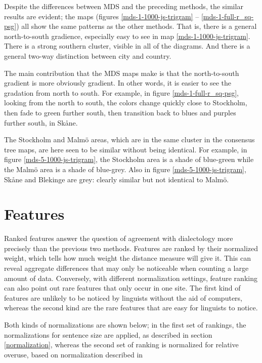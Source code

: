 Despite the differences between MDS and the preceding methods, the
similar results are evident; the maps (figures
\ref{mds-1-1000-js-trigram} -- \ref{mds-1-full-r_sq-psg}) all show
the same patterns as the other methods. That is, there is a general
north-to-south gradience, especially easy to see in map
\ref{mds-1-1000-js-trigram}. There is a strong southern cluster,
visible in all of the diagrams. And there is a general two-way
distinction between city and country.

The main contribution that the MDS maps make is that the
north-to-south gradient is more obviously gradient. In other words, it
is easier to see the gradation from north to south. For example, in
figure \ref{mds-1-full-r_sq-psg}, looking from the north to south, the
colors change quickly close to Stockholm, then fade to green further
south, then transition back to blues and purples further south, in
Sk\aa{}ne.

The Stockholm and Malm\"o areas, which are in the same cluster in the
consensus tree maps, are here seen to be similar without being
identical. For example, in figure \ref{mds-5-1000-js-trigram}, the
Stockholm area is a shade of blue-green while the Malm\"o area is a
shade of blue-grey. Also in figure \ref{mds-5-1000-js-trigram},
Sk\aa{}ne and Blekinge are grey: clearly similar but not identical to
Malm\"o.

\section{Features}
\label{section-features}

Ranked features answer the question of agreement with dialectology
more precisely than the previous two methods. Features are ranked by
their normalized weight, which tells how much weight the distance
measure will give it. This can reveal aggregate differences that may
only be noticeable when counting a large amount of data. Conversely,
with different normalization settings, feature ranking can also point
out rare features that only occur in one site. The first kind of
features are unlikely to be noticed by linguists without the aid of
computers, whereas the second kind are the rare features that are easy
for linguists to notice.

Both kinds of normalizations are shown below; in the first set of
rankings, the normalizations for sentence size are applied, as
described in section \ref{normalization}, whereas the second set of
ranking is normalized for relative overuse, based on
 normalization described in
